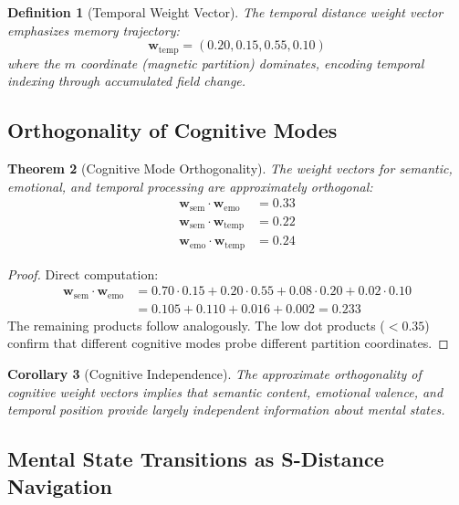 \documentclass[aps,prd,twocolumn,superscriptaddress,floatfix,nofootinbib]{revtex4-2}
\newtheorem{theorem}{Theorem}[section]
\newtheorem{corollary}[theorem]{Corollary}
\newtheorem{definition}[theorem]{Definition}
\theoremstyle{remark}
\newcommand{\wvec}{\mathbf{w}}
\begin{document}
\begin{definition}[Temporal Weight Vector]
\label{def:temporal_weight}
The temporal distance weight vector emphasizes memory trajectory:
\begin{equation}
\wvec_{\text{temp}} = (0.20, 0.15, 0.55, 0.10)
\end{equation}
where the $m$ coordinate (magnetic partition) dominates, encoding temporal indexing through accumulated field change.
\end{definition}

\subsection{Orthogonality of Cognitive Modes}

\begin{theorem}[Cognitive Mode Orthogonality]
\label{thm:cognitive_orthogonal}
The weight vectors for semantic, emotional, and temporal processing are approximately orthogonal:
\begin{align}
\wvec_{\text{sem}} \cdot \wvec_{\text{emo}} &= 0.33 \\
\wvec_{\text{sem}} \cdot \wvec_{\text{temp}} &= 0.22 \\
\wvec_{\text{emo}} \cdot \wvec_{\text{temp}} &= 0.24
\end{align}
\end{theorem}

\begin{proof}
Direct computation:
\begin{align}
\wvec_{\text{sem}} \cdot \wvec_{\text{emo}} &= 0.70 \cdot 0.15 + 0.20 \cdot 0.55 + 0.08 \cdot 0.20 + 0.02 \cdot 0.10 \\
&= 0.105 + 0.110 + 0.016 + 0.002 = 0.233
\end{align}
The remaining products follow analogously. The low dot products ($< 0.35$) confirm that different cognitive modes probe different partition coordinates.
\end{proof}

\begin{corollary}[Cognitive Independence]
\label{cor:cognitive_indep}
The approximate orthogonality of cognitive weight vectors implies that semantic content, emotional valence, and temporal position provide largely independent information about mental states.
\end{corollary}

\subsection{Mental State Transitions as S-Distance Navigation}
\end{document}
